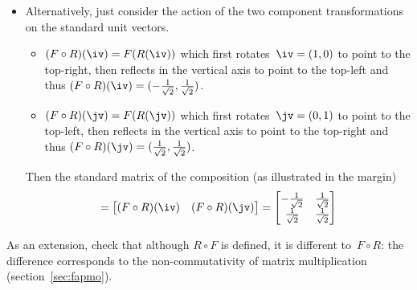 \begin{example}
\begin{solution}
\begin{itemize}
\item Alternatively, just consider the action of the two component transformations on the standard unit vectors.
\begin{itemize}
\item \((F\circ R)(\iv)=F(R(\iv))\) which first rotates~\(\iv=(1,0)\) to point to the top-right, then reflects in the vertical axis to point to the top-left and thus \((F\circ R)(\iv)=(-\rt,\rt)\).
\item \((F\circ R)(\jv)=F(R(\jv))\) which first rotates~\(\jv=(0,1)\) to point to the top-left, then reflects in the vertical axis to point to the top-right and thus \((F\circ R)(\jv)=(\rt,\rt)\).
\end{itemize}
Then the standard matrix of the composition (as illustrated in the margin)
%
\begin{equation*}
[F\circ R]=\begin{bmatrix}(F\circ R)(\iv)&(F\circ R)(\jv)  \end{bmatrix}
=\begin{bmatrix} -\rt&\rt\\\rt&\rt \end{bmatrix}
\end{equation*}
\end{itemize}
\end{solution}
As an extension, check that although \(R\circ F\) is defined, it is different to~\(F\circ R\): the difference corresponds to the non-commutativity of matrix multiplication (section~\ref{sec:fapmo}).
\end{example}



